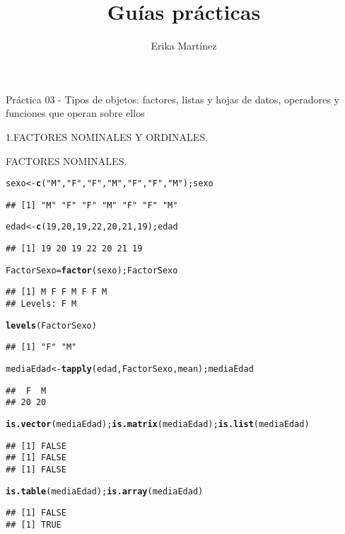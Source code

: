 \documentclass[10pt,a4paper]{article}\usepackage[]{graphicx}\usepackage[]{color}
\author{Erika Martínez}
\title{Guías prácticas}
\makeatletter
\newcommand{\hlnum}[1]{\textcolor[rgb]{0.686,0.059,0.569}{#1}}%
\newcommand{\hlstr}[1]{\textcolor[rgb]{0.192,0.494,0.8}{#1}}%
\newcommand{\hlstd}[1]{\textcolor[rgb]{0.345,0.345,0.345}{#1}}%
\newcommand{\hlkwb}[1]{\textcolor[rgb]{0.69,0.353,0.396}{#1}}%
\newcommand{\hlkwd}[1]{\textcolor[rgb]{0.737,0.353,0.396}{\textbf{#1}}}%
\newenvironment{kframe}{%
 \def\at@end@of@kframe{}%
 \ifinner\ifhmode%
  \def\at@end@of@kframe{\end{minipage}}%
  \begin{minipage}{\columnwidth}%
 \fi\fi%
 \def\FrameCommand##1{\hskip\@totalleftmargin \hskip-\fboxsep
 \colorbox{shadecolor}{##1}\hskip-\fboxsep
     \hskip-\linewidth \hskip-\@totalleftmargin \hskip\columnwidth}%
 \MakeFramed {\advance\hsize-\width
   \@totalleftmargin\z@ \linewidth\hsize
   \@setminipage}}%
 {\par\unskip\endMakeFramed%
 \at@end@of@kframe}
\newenvironment{knitrout}{}{} %
\makeatother
\begin{document}
\maketitle
\newpage


Práctica 03 - Tipos de objetos: 
factores, listas y hojas de datos, operadores y funciones que operan sobre ellos


1.FACTORES NOMINALES Y ORDINALES. 

FACTORES NOMINALES.

\begin{knitrout}
\color{fgcolor}\begin{kframe}
\begin{alltt}
\hlstd{sexo} \hlkwb{<-} \hlkwd{c}\hlstd{(}\hlstr{"M"}\hlstd{,} \hlstr{"F"}\hlstd{,} \hlstr{"F"}\hlstd{,} \hlstr{"M"}\hlstd{,} \hlstr{"F"}\hlstd{,} \hlstr{"F"}\hlstd{,} \hlstr{"M"}\hlstd{); sexo}
\end{alltt}
\begin{verbatim}
## [1] "M" "F" "F" "M" "F" "F" "M"
\end{verbatim}
\begin{alltt}
\hlstd{edad} \hlkwb{<-} \hlkwd{c}\hlstd{(}\hlnum{19}\hlstd{,} \hlnum{20}\hlstd{,} \hlnum{19}\hlstd{,} \hlnum{22}\hlstd{,} \hlnum{20}\hlstd{,} \hlnum{21}\hlstd{,} \hlnum{19}\hlstd{); edad}
\end{alltt}
\begin{verbatim}
## [1] 19 20 19 22 20 21 19
\end{verbatim}
\begin{alltt}
\hlstd{FactorSexo} \hlkwb{=} \hlkwd{factor}\hlstd{(sexo); FactorSexo}
\end{alltt}
\begin{verbatim}
## [1] M F F M F F M
## Levels: F M
\end{verbatim}
\begin{alltt}
\hlkwd{levels}\hlstd{(FactorSexo)}
\end{alltt}
\begin{verbatim}
## [1] "F" "M"
\end{verbatim}
\begin{alltt}
\hlstd{mediaEdad} \hlkwb{<-} \hlkwd{tapply}\hlstd{(edad, FactorSexo, mean); mediaEdad}
\end{alltt}
\begin{verbatim}
##  F  M 
## 20 20
\end{verbatim}
\begin{alltt}
\hlkwd{is.vector}\hlstd{(mediaEdad);} \hlkwd{is.matrix}\hlstd{(mediaEdad);} \hlkwd{is.list}\hlstd{(mediaEdad)}
\end{alltt}
\begin{verbatim}
## [1] FALSE
## [1] FALSE
## [1] FALSE
\end{verbatim}
\begin{alltt}
\hlkwd{is.table}\hlstd{(mediaEdad);} \hlkwd{is.array}\hlstd{(mediaEdad)}
\end{alltt}
\begin{verbatim}
## [1] FALSE
## [1] TRUE
\end{verbatim}
\end{kframe}
\end{knitrout}
\end{document}
